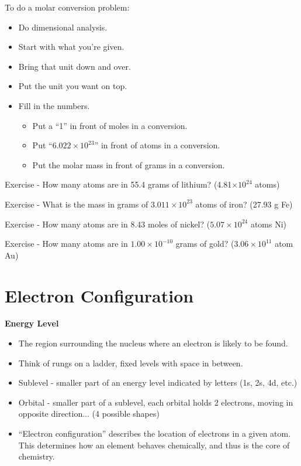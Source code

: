 \documentclass[../hchem.tex]{subfiles}
\begin{document}
To do a molar conversion problem:
\begin{itemize}
    \item Do dimensional analysis.
    \item Start with what you're given.
    \item Bring that unit down and over.
    \item Put the unit you want on top.
    \item Fill in the numbers.
    \begin{itemize}
        \item Put a ``1'' in front of moles in a conversion.
        \item Put ``$6.022\times10^{23}$'' in front of atoms in a conversion.
        \item Put the molar mass in front of grams in a conversion.
    \end{itemize}
\end{itemize}

Exercise - How many atoms are in 55.4 grams of lithium? (4.81$\times10^{24}$ atoms)

Exercise - What is the mass in grams of $3.011\times10^{23}$ atoms of iron? (27.93 g Fe)

Exercise - How many atoms are in 8.43 moles of nickel? ($5.07\times 10^{24}$ atoms Ni)

Exercise - How many atoms are in $1.00\times10^{-10}$ grams of gold? ($3.06\times 10^{11}$ atom Au)
\section{Electron Configuration}
\textbf{Energy Level}
\begin{itemize}
    \item The region surrounding the nucleus where an electron is likely to be found.
    \item Think of rungs on a ladder, fixed levels with space in between.
    \item Sublevel - smaller part of an energy level indicated by letters (1s, 2s, 4d, etc.)
    \item Orbital - smaller part of a sublevel, each orbital holds 2 electrons, moving in opposite direction... (4 possible shapes)
\end{itemize}

\begin{itemize}
    \item ``Electron configuration'' describes the location of electrons in a given atom. This determines how an element behaves chemically, and thus is the core of chemistry.
\end{itemize}
\end{document}
